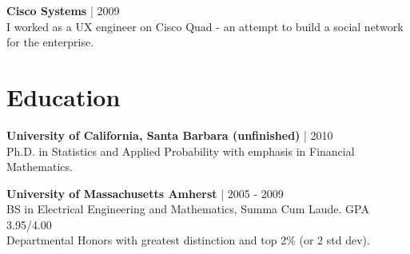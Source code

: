 \documentclass[a4paper,10pt]{article}
\begin{document}
\vspace{5pt} %

\noindent
\textbf{Cisco Systems} | 2009 \\
I worked as a UX engineer on Cisco Quad - an attempt to build a social network for the enterprise.

\section*{Education}

\noindent
\textbf{University of California, Santa Barbara (unfinished)} | 2010 \\
Ph.D. in Statistics and Applied Probability with emphasis in Financial Mathematics.

\vspace{5pt} %

\noindent
\textbf{University of Massachusetts Amherst} | 2005 - 2009 \\
BS in Electrical Engineering and Mathematics, Summa Cum Laude. GPA 3.95/4.00 \\
Departmental Honors with greatest distinction and top 2\% (or 2 std dev).
\end{document}
